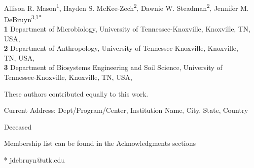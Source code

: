 \documentclass[
  10pt,
  letterpaper,
]{article}
\begin{document}
\vspace*{0.2in}

\begin{flushleft}
{\Large
\textbf{} %
}
\newline
\\
Allison R. Mason\textsuperscript{1}, Hayden S.
McKee-Zech\textsuperscript{2}, Dawnie W.
Steadman\textsuperscript{2}, Jennifer M. DeBruyn\textsuperscript{3,1*}
\\
\bigskip
\textbf{1} Department of Microbiology, University of
Tennessee-Knoxville, Knoxville, TN, USA, \\ \textbf{2} Department of
Anthropology, University of
Tennessee-Knoxville, Knoxville, TN, USA, \\ \textbf{3} Department of
Biosystems Engineering and Soil Science, University of
Tennessee-Knoxville, Knoxville, TN, USA, 
\bigskip

% 
%
\Yinyang These authors contributed equally to this work.


\textcurrency Current Address: Dept/Program/Center, Institution Name, City, State, Country %

\dag Deceased

\textpilcrow Membership list can be found in the Acknowledgments
sections

* jdebruyn@utk.edu

\end{flushleft}
\end{document}
